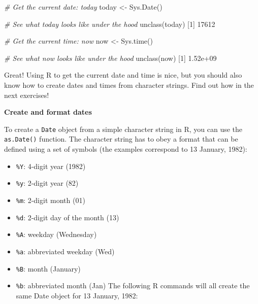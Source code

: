 \documentclass[]{article}
\providecommand{\tightlist}{%
  \setlength{\itemsep}{0pt}\setlength{\parskip}{0pt}}
\newcommand{\hlnum}[1]{\textcolor[rgb]{0.816,0.125,0.439}{#1}}%
\newcommand{\hlstr}[1]{\textcolor[rgb]{0.251,0.627,0.251}{#1}}%
\newcommand{\hlcom}[1]{\textcolor[rgb]{0.502,0.502,0.502}{\textit{#1}}}%
\newcommand{\hlstd}[1]{\textcolor[rgb]{0.251,0.251,0.251}{#1}}%
\newcommand{\hlkwc}[1]{\textcolor[rgb]{0.251,0.251,0.251}{#1}}%
\newcommand{\hlkwd}[1]{\textcolor[rgb]{0.878,0.439,0.125}{#1}}%
\newenvironment{Shaded}{\begin{myshaded}}{\end{myshaded}}
\newcommand{\KeywordTok}[1]{\hlkwd{#1}}
\newcommand{\DataTypeTok}[1]{\hlkwc{#1}}
\newcommand{\DecValTok}[1]{\hlnum{#1}}
\newcommand{\FloatTok}[1]{\hlnum{#1}}
\newcommand{\StringTok}[1]{\hlstr{#1}}
\newcommand{\CommentTok}[1]{\hlcom{#1}}
\newcommand{\NormalTok}[1]{\hlstd{#1}}
\begin{document}
\begin{Shaded}
\begin{Highlighting}[]
\CommentTok{# Get the current date: today}
\NormalTok{today <-}\StringTok{ }\KeywordTok{Sys.Date}\NormalTok{()}

\CommentTok{# See what today looks like under the hood}
\KeywordTok{unclass}\NormalTok{(today)}
\NormalTok{   [}\DecValTok{1}\NormalTok{] }\DecValTok{17612}

\CommentTok{# Get the current time: now}
\NormalTok{now <-}\StringTok{ }\KeywordTok{Sys.time}\NormalTok{()}

\CommentTok{# See what now looks like under the hood}
\KeywordTok{unclass}\NormalTok{(now)}
\NormalTok{   [}\DecValTok{1}\NormalTok{] }\FloatTok{1.52e+09}
\end{Highlighting}
\end{Shaded}

Great! Using R to get the current date and time is nice, but you should
also know how to create dates and times from character strings. Find out
how in the next exercises!

\textbf{Create and format dates}

To create a \texttt{Date} object from a simple character string in R,
you can use the \texttt{as.Date()} function. The character string has to
obey a format that can be defined using a set of symbols (the examples
correspond to 13 January, 1982):

\begin{itemize}
\tightlist
\item
  \texttt{\%Y}: 4-digit year (1982)
\item
  \texttt{\%y}: 2-digit year (82)
\item
  \texttt{\%m}: 2-digit month (01)
\item
  \texttt{\%d}: 2-digit day of the month (13)
\item
  \texttt{\%A}: weekday (Wednesday)
\item
  \texttt{\%a}: abbreviated weekday (Wed)
\item
  \texttt{\%B}: month (January)
\item
  \texttt{\%b}: abbreviated month (Jan) The following R commands will
  all create the same Date object for 13 January, 1982:
\end{itemize}

\begin{Shaded}
\end{Shaded}
\end{document}
